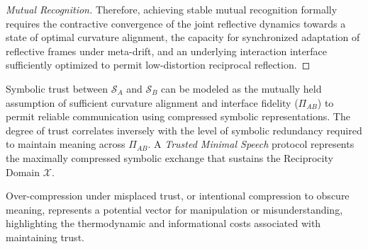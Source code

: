 \begin{proof}[Mutual Recognition]
Therefore, achieving stable mutual recognition formally requires the contractive convergence of the joint reflective dynamics towards a state of optimal curvature alignment, the capacity for synchronized adaptation of reflective frames under meta-drift, and an underlying interaction interface sufficiently optimized to permit low-distortion reciprocal reflection.
\end{proof}
\begin{definition}
\label{definition:bk9_symbolic_trust_as_compression_protocol}
Symbolic trust between $\mathcal{S}_A$ and $\mathcal{S}_B$ can be modeled as the mutually held assumption of sufficient curvature alignment and interface fidelity ($\Pi_{AB}$) to permit reliable communication using compressed symbolic representations. The degree of trust correlates inversely with the level of symbolic redundancy required to maintain meaning across $\Pi_{AB}$. A \emph{Trusted Minimal Speech} protocol represents the maximally compressed symbolic exchange that sustains the Reciprocity Domain $\mathcal{X}$.
\end{definition}
\begin{remark}
\label{remark:bk9_vectors_of_manipulation}
Over-compression under misplaced trust, or intentional compression to obscure meaning, represents a potential vector for manipulation or misunderstanding, highlighting the thermodynamic and informational costs associated with maintaining trust.
\end{remark}
